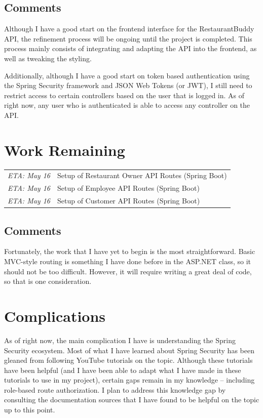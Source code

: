 \documentclass[letterpaper,11pt]{../../templates/texMemo}
\begin{document}
    \subsection{Comments}
    Although I have a good start on the frontend interface for the RestaurantBuddy API, the refinement process will be ongoing until the project is completed. This process mainly consists of integrating and adapting the API into the frontend, as well as tweaking the styling.

    Additionally, although I have a good start on token based authentication using the Spring Security framework and JSON Web Tokens (or JWT), I still need to restrict access to certain controllers based on the user that is logged in. As of right now, any user who is authenticated is able to access any controller on the API.


    \section{Work Remaining}
    \begin{tabular}{|r l|}
        \hline
        \emph{ETA: May 16} & Setup of Restaurant Owner API Routes (Spring Boot) \\
        \emph{ETA: May 16} & Setup of Employee API Routes (Spring Boot)         \\
        \emph{ETA: May 16} & Setup of Customer API Routes (Spring Boot)         \\
        \hline
    \end{tabular}

    \subsection{Comments}
    Fortunately, the work that I have yet to begin is the most straightforward. Basic MVC-style routing is something I have done before in the ASP.NET class, so it should not be too difficult. However, it will require writing a great deal of code, so that is one consideration.


    \section{Complications}
    As of right now, the main complication I have is understanding the Spring Security ecosystem. Most of what I have learned about Spring Security has been gleaned from following YouTube tutorials on the topic. Although these tutorials have been helpful (and I have been able to adapt what I have made in these tutorials to use in my project), certain gaps remain in my knowledge -- including role-based route authorization. I plan to address this knowledge gap by consulting the documentation sources that I have found to be helpful on the topic up to this point.
\end{document}
